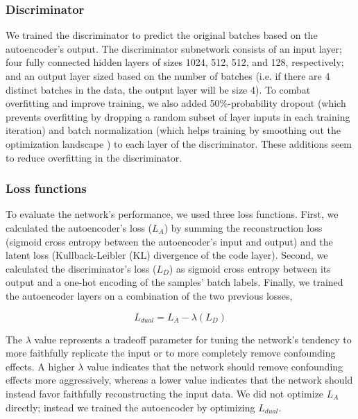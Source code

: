 \documentclass[11pt]{article}
\begin{document}
\subsubsection{Discriminator}

We trained the discriminator to predict the original batches based on the autoencoder's output.
The discriminator subnetwork consists of an input layer; four fully connected hidden layers of sizes 1024, 512, 512, and 128, respectively; and an output layer sized based on the number of batches (i.e. if there are 4 distinct batches in the data, the output layer will be size 4).
To combat overfitting and improve training, we also added 50\%-probability dropout \cite{srivastava_dropout_2014} (which prevents overfitting by dropping a random subset of layer inputs in each training iteration) and batch normalization \cite{ioffe_batch_2015} (which helps training by smoothing out the optimization landscape \citep{santurkar_how_2018}) to each layer of the discriminator.
These additions seem to reduce overfitting in the discriminator.

\subsubsection{Loss functions}

To evaluate the network's performance, we used three loss functions.
First, we calculated the autoencoder's loss ($L_A$) by summing the reconstruction loss (sigmoid cross entropy between the autoencoder's input and output) and the latent loss (Kullback-Leibler (KL) divergence \cite{kullback_information_1951} of the code layer).
Second, we calculated the discriminator's loss ($L_D$) as sigmoid cross entropy between its output and a one-hot encoding of the samples' batch labels.
Finally, we trained the autoencoder layers on a combination of the two previous losses,

\begin{equation}
	\label{dual_loss}
	L_{dual} = L_A - \lambda{}(L_D)
\end{equation}

The $\lambda$ value represents a tradeoff parameter for tuning the network's tendency to more faithfully replicate the input or to more completely remove confounding effects.
A higher $\lambda$ value indicates that the network should remove confounding effects more aggressively, whereas a lower value indicates that the network should instead favor faithfully reconstructing the input data.
We did not optimize $L_A$ directly; instead we trained the autoencoder by optimizing $L_{dual}$.
\end{document}
